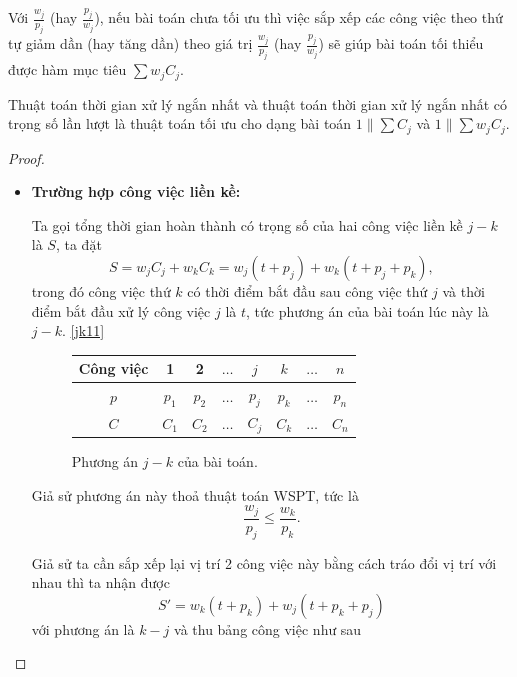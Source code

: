 \begin{nx}
Với $\frac{w_j}{p_j}$ (hay $\frac{p_j}{w_j}$), nếu bài toán chưa tối ưu thì việc sắp xếp các công việc theo thứ tự giảm dần (hay tăng dần) theo giá trị $\frac{w_j}{p_j}$ (hay $\frac{p_j}{w_j}$) sẽ giúp bài toán tối thiểu được hàm mục tiêu $\sum w_j C_j$.
\end{nx}

\begin{dl}
	Thuật toán thời gian xử lý ngắn nhất và thuật toán thời gian xử lý ngắn nhất có trọng số lần lượt là thuật toán tối ưu cho dạng bài toán $1 \| \sum C_j$ và $1 \| \sum w_j C_j$.
\end{dl}

\begin{proof}

\phantom{text}

\begin{itemize}
\item \textbf{Trường hợp công việc liền kề:}

	Ta gọi tổng thời gian hoàn thành có trọng số của hai công việc liền kề $j-k$ là $S$, ta đặt
	\begin{equation} \label{S}
		S = w_j C_j + w_k C_k = w_j(t+p_j) + w_k(t+p_j+p_k),
	\end{equation}
	trong đó công việc thứ $k$ có thời điểm bắt đầu sau công việc thứ $j$ và thời điểm bắt đầu xử lý công việc $j$ là $t$, tức phương án của bài toán lúc này là $j - k$. \eqref{jk11}
	
	\begin{figure}[h!]
		\centering
		 \begin{tabular}{|c | c c c c c c c |} 
		 \hline
		 Công việc & 1 & 2 & $\ldots$ & $j$ & $k$ & $\ldots$ & $n$ \\
		 \hline\hline
		 $p$ & $p_1$ & $p_2$ & $\ldots$ & $p_j$ & $p_k$ & $\ldots$ & $p_n$ \\
		 $C$ & $C_1$ & $C_2$ & $\ldots$ & $C_j$ & $C_k$ & $\ldots$ & $C_n$ \\
		 \hline
		 \end{tabular}
	\caption{\label{jk11}Phương án $j - k$ của bài toán.}
	\end{figure}
	
	Giả sử phương án này thoả thuật toán WSPT, tức là
	\begin{equation}
	\frac{w_j}{p_j} \leq \frac{w_k}{p_k}.
	\end{equation}
	
	Giả sử ta cần sắp xếp lại vị trí 2 công việc này bằng cách tráo đổi vị trí với nhau thì ta nhận được
	\begin{equation} \label{S'}
		S' = w_k(t+p_k) + w_j(t+p_k+p_j)
	\end{equation}
	với phương án là $k-j$ và thu bảng công việc như sau
	

\end{itemize}
\end{proof}
